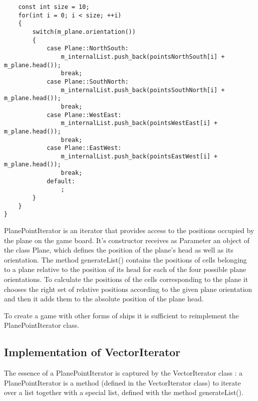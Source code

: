 \begin{lstlisting}
    const int size = 10;
    for(int i = 0; i < size; ++i)
    {
        switch(m_plane.orientation())
        {
            case Plane::NorthSouth:
                m_internalList.push_back(pointsNorthSouth[i] + m_plane.head());
                break;
            case Plane::SouthNorth:
                m_internalList.push_back(pointsSouthNorth[i] + m_plane.head());
                break;
            case Plane::WestEast:
                m_internalList.push_back(pointsWestEast[i] + m_plane.head());
                break;
            case Plane::EastWest:
                m_internalList.push_back(pointsEastWest[i] + m_plane.head());
                break;
            default:
                ;
        }
    }
}
\end{lstlisting}

PlanePointIterator is an iterator that provides access to the positions occupied by the plane on the game board. It's constructor receives as Parameter an object of the class Plane, which defines the position of the plane's head as well as its orientation. The method generateList() contains the positions of cells belonging to a plane relative to the position of its head for each of the four possible plane orientations. To calculate the positions of the cells corresponding to the plane it chooses the right set of relative positions according to the given plane orientation and then it adds them to the absolute position of the plane head.

To create a game with other forms of ships it is sufficient to reimplement the PlanePointIterator class.

\subsection {Implementation of VectorIterator}

The essence of a PlanePointIterator is captured by the VectorIterator class : a PlanePointIterator is a method (defined in the VectorIterator class) to iterate over a list together with a special list, defined with the method generateList().

